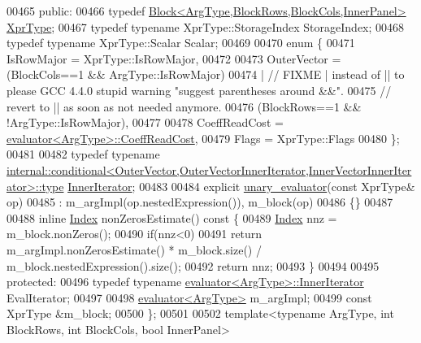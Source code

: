 \begin{DoxyCode}
00465   \textcolor{keyword}{public}:
00466     \textcolor{keyword}{typedef} \hyperlink{group___core___module_class_eigen_1_1_block}{Block<ArgType,BlockRows,BlockCols,InnerPanel>} 
      \hyperlink{group___core___module_class_eigen_1_1_block}{XprType};
00467     \textcolor{keyword}{typedef} \textcolor{keyword}{typename} XprType::StorageIndex StorageIndex;
00468     \textcolor{keyword}{typedef} \textcolor{keyword}{typename} XprType::Scalar Scalar;
00469 
00470     \textcolor{keyword}{enum} \{
00471       IsRowMajor = XprType::IsRowMajor,
00472 
00473       OuterVector =  (BlockCols==1 && ArgType::IsRowMajor)
00474                     | \textcolor{comment}{// FIXME | instead of || to please GCC 4.4.0 stupid warning "suggest parentheses
       around &&".}
00475                       \textcolor{comment}{// revert to || as soon as not needed anymore.}
00476                      (BlockRows==1 && !ArgType::IsRowMajor),
00477 
00478       CoeffReadCost = \hyperlink{struct_eigen_1_1internal_1_1evaluator}{evaluator<ArgType>::CoeffReadCost},
00479       Flags = XprType::Flags
00480     \};
00481 
00482     \textcolor{keyword}{typedef} \textcolor{keyword}{typename} 
      \hyperlink{class_eigen_1_1internal_1_1_tensor_lazy_evaluator_writable}{internal::conditional<OuterVector,OuterVectorInnerIterator,InnerVectorInnerIterator>::type}
       \hyperlink{class_eigen_1_1internal_1_1_tensor_lazy_evaluator_writable}{InnerIterator};
00483 
00484     \textcolor{keyword}{explicit} \hyperlink{struct_eigen_1_1internal_1_1unary__evaluator}{unary\_evaluator}(\textcolor{keyword}{const} XprType& op)
00485       : m\_argImpl(op.nestedExpression()), m\_block(op)
00486     \{\}
00487 
00488     \textcolor{keyword}{inline} \hyperlink{namespace_eigen_a62e77e0933482dafde8fe197d9a2cfde}{Index} nonZerosEstimate()\textcolor{keyword}{ const }\{
00489       \hyperlink{namespace_eigen_a62e77e0933482dafde8fe197d9a2cfde}{Index} nnz = m\_block.nonZeros();
00490       \textcolor{keywordflow}{if}(nnz<0)
00491         \textcolor{keywordflow}{return} m\_argImpl.nonZerosEstimate() * m\_block.size() / m\_block.nestedExpression().size();
00492       \textcolor{keywordflow}{return} nnz;
00493     \}
00494 
00495   \textcolor{keyword}{protected}:
00496     \textcolor{keyword}{typedef} \textcolor{keyword}{typename} \hyperlink{struct_eigen_1_1internal_1_1evaluator}{evaluator<ArgType>::InnerIterator} EvalIterator;
00497 
00498     \hyperlink{struct_eigen_1_1internal_1_1evaluator}{evaluator<ArgType>} m\_argImpl;
00499     \textcolor{keyword}{const} XprType &m\_block;
00500 \};
00501 
00502 \textcolor{keyword}{template}<\textcolor{keyword}{typename} ArgType, \textcolor{keywordtype}{int} BlockRows, \textcolor{keywordtype}{int} BlockCols, \textcolor{keywordtype}{bool} InnerPanel>

\end{DoxyCode}
